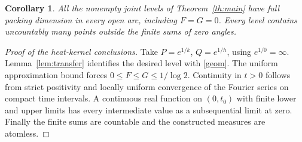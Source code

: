 \documentclass[11pt]{article}
\newtheorem{corollary}[theorem]{Corollary}
\begin{document}
\begin{corollary}\label{cor:pack}
All the nonempty joint levels of Theorem~\ref{th:main} have full packing dimension in every open arc, including $F=G=0$. Every level contains uncountably many points outside the finite sums of zero angles.
\end{corollary}
\begin{proof}[Proof of the heat-kernel conclusions]
Take $P=e^{1/k}$, $Q=e^{1/h}$, using $e^{1/0}=\infty$. Lemma~\ref{lem:transfer} identifies the desired level with \eqref{geom}. The uniform approximation bound forces $0\le F\le G\le1/\log2$. Continuity in $t>0$ follows from strict positivity and locally uniform convergence of the Fourier series on compact time intervals. A continuous real function on $(0,t_0)$ with finite lower and upper limits has every intermediate value as a subsequential limit at zero. Finally the finite sums are countable and the constructed measures are atomless.
\end{proof}
\end{document}
